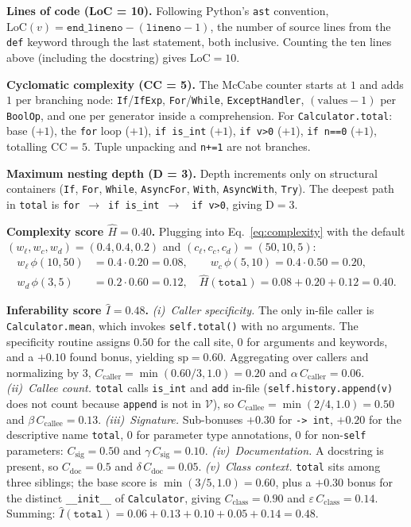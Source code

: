 \textbf{Lines of code (LoC = 10).}
Following Python's \texttt{ast} convention,
$\mathrm{LoC}(v)=\texttt{end\_lineno}-(\texttt{lineno}-1)$, the number
of source lines from the \texttt{def} keyword through the last
statement, both inclusive. Counting the ten lines above (including the
docstring) gives $\mathrm{LoC}=10$.

\textbf{Cyclomatic complexity (CC = 5).}
The McCabe counter starts at $1$ and adds $1$ per branching node:
\texttt{If}/\texttt{IfExp}, \texttt{For}/\texttt{While},
\texttt{ExceptHandler}, $(\text{values}{-}1)$ per \texttt{BoolOp}, and
one per generator inside a comprehension. For
\texttt{Calculator.total}: base ($+1$), the \texttt{for} loop ($+1$),
\texttt{if is\_int} ($+1$), \texttt{if v>0} ($+1$), \texttt{if n==0}
($+1$), totalling $\mathrm{CC}=5$. Tuple unpacking and \texttt{n+=1}
are not branches.

\textbf{Maximum nesting depth (D = 3).}
Depth increments only on structural containers (\texttt{If},
\texttt{For}, \texttt{While}, \texttt{AsyncFor}, \texttt{With},
\texttt{AsyncWith}, \texttt{Try}). The deepest path in
\texttt{total} is \texttt{for}~$\to$~\texttt{if is\_int}~$\to$~%
\texttt{if v>0}, giving $\mathrm{D}=3$.

\textbf{Complexity score $\hat{H}=0.40$.}
Plugging into Eq.~\ref{eq:complexity} with the default
$(w_{\ell},w_{c},w_{d})=(0.4,0.4,0.2)$ and
$(c_{\ell},c_{c},c_{d})=(50,10,5)$:
\begin{align*}
w_{\ell}\,\phi(10,50) &= 0.4\!\cdot\!0.20 = 0.08, \qquad
w_{c}\,\phi(5,10)     = 0.4\!\cdot\!0.50 = 0.20, \\
w_{d}\,\phi(3,5)      &= 0.2\!\cdot\!0.60 = 0.12, \quad
\hat{H}(\texttt{total}) = 0.08+0.20+0.12 = 0.40.
\end{align*}

\textbf{Inferability score $\hat{I}=0.48$.}
\emph{(i)~Caller specificity.} The only in-file caller is
\texttt{Calculator.mean}, which invokes \texttt{self.total()} with no
arguments. The specificity routine assigns $0.50$ for the call site,
$0$ for arguments and keywords, and a $+0.10$ found bonus, yielding
$\mathrm{sp}=0.60$. Aggregating over callers and normalizing by $3$,
$C_{\mathrm{caller}}=\min(0.60/3,1.0)=0.20$ and
$\alpha\,C_{\mathrm{caller}}=0.06$.
\emph{(ii)~Callee count.} \texttt{total} calls \texttt{is\_int} and
\texttt{add} in-file (\texttt{self.history.append(v)} does not count
because \texttt{append} is not in $\mathcal{V}$), so
$C_{\mathrm{callee}}=\min(2/4,1.0)=0.50$ and
$\beta\,C_{\mathrm{callee}}=0.13$.
\emph{(iii)~Signature.} Sub-bonuses $+0.30$ for \texttt{-> int},
$+0.20$ for the descriptive name \texttt{total}, $0$ for parameter type
annotations, $0$ for non-\texttt{self} parameters: $C_{\mathrm{sig}}=0.50$
and $\gamma\,C_{\mathrm{sig}}=0.10$.
\emph{(iv)~Documentation.} A docstring is present, so
$C_{\mathrm{doc}}=0.5$ and $\delta\,C_{\mathrm{doc}}=0.05$.
\emph{(v)~Class context.} \texttt{total} sits among three siblings;
the base score is $\min(3/5,1.0)=0.60$, plus a $+0.30$ bonus for the
distinct \texttt{\_\_init\_\_} of \texttt{Calculator}, giving
$C_{\mathrm{class}}=0.90$ and $\varepsilon\,C_{\mathrm{class}}=0.14$.
Summing: $\hat{I}(\texttt{total})=0.06+0.13+0.10+0.05+0.14=0.48$.

